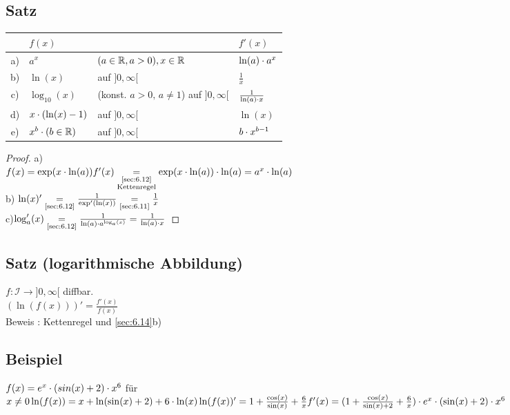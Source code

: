 \subsection[Satz:]{Satz}
\begin{tabular}{cll|l}
	& $f(x)$ & & $f'(x)$\\
	\hline
	a) & $a^x$ & $(a \in \mathbb{R}, a> 0), x\in \mathbb{R}$ & $\ln(a) \cdot a^x$\\
	b) & $\ln(x)$ & auf $]0,\infty[$ & $\frac{1}{x}$\\
	c) & $\log_{10}(x)$ & (konst. $a > 0,\, a \ne 1$) auf $]0,\infty[$ & $\frac{1}{\ln(a) \cdot x}$\\
	d) & $x \cdot (\ln(x) -1 )$ & auf $]0,\infty[$ & $\ln(x)$\\
	e) & $x^b \cdot (b \in \mathbb{R})$& auf $]0,\infty[ $ & $b \cdot x^{b-1}$ 
\end{tabular}
\begin{proof}
	a)\\
	$f(x) = \exp(x \cdot \ln(a))\\
	f'(x) \underset{\substack
		{\text{\ref{sec:6.12}}\\\text{Kettenregel}}}{=} \exp(x \cdot \ln(a)) \cdot \ln(a) = a^x \cdot \ln(a)$\\
	b) $\ln(x)'  \underset{\text{\ref{sec:6.12}}}{=} \frac{1}{\exp'(\ln(x))} \underset{\text{\ref{sec:6.11}}}{=} \frac{1}{x}$\\
	c)$ \log'_a(x) \underset{\text{\ref{sec:6.12}}}{=} \frac{1}{\ln(a) \cdot a^{\log_a(x)}} = \frac{1}{\ln(a) \cdot x}$
\end{proof}
\subsection{Satz (logarithmische Abbildung)}
$f : \mathcal{I} \to ]0,\infty[$ diffbar.\\
$(\ln(f(x)))' = \frac{f'(x)}{f(x)}$\\
Beweis : Kettenregel und \ref{sec:6.14}b)\\
\subsection{Beispiel}
$f(x) = e^x \cdot (sin(x) +2) \cdot x^6$ für $x \ne 0\\
\ln(f(x)) = x + \ln(\sin(x) +2) + 6 \cdot \ln(x)\\
\ln(f(x))' = 1 + \frac{\cos(x)}{\sin(x)} + \frac{6}{x}\\
f'(x) = (1 + \frac{\cos(x)}{\sin(x) + 2} + \frac{6}{x}) \cdot e^x \cdot (\sin(x) + 2) \cdot x^6$\\
